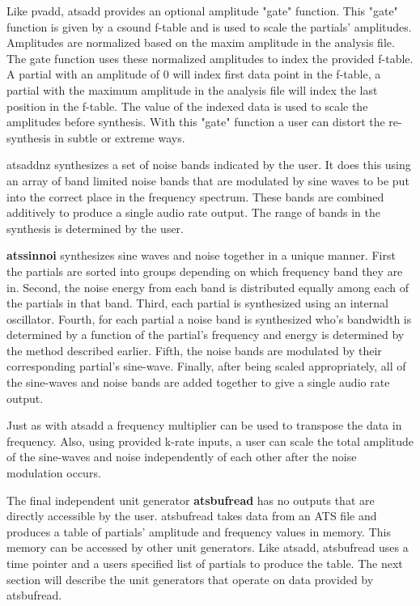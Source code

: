 \documentclass[10pt,letterpaper]{article}
\begin{document}
Like pvadd, atsadd provides an optional amplitude "gate" function.  This "gate" function is given by a csound f-table and is used to scale the partials' amplitudes.  Amplitudes are normalized based on the maxim amplitude in the analysis file.  The gate function uses these normalized amplitudes to index the provided f-table.  A partial with an amplitude of 0 will index first data point in the f-table, a partial with the maximum amplitude in the analysis file will index the last position in the f-table.  The value of the indexed data is used to scale the amplitudes before synthesis.  With this "gate" function a user can distort the re-synthesis in subtle or extreme ways.

atsaddnz synthesizes a set of noise bands indicated by the user.  It does this using an array of band limited noise bands that are modulated by sine waves to be put into the correct place in the frequency spectrum.  These bands are combined additively to produce a single audio rate output.  The range of bands in the synthesis is determined by the user.

\textbf{atssinnoi} synthesizes sine waves and noise together in a unique manner.  First the partials are sorted into groups depending on which frequency band they are in.  Second, the noise energy from each band is distributed equally among each of the partials in that band.  Third, each partial is synthesized using an internal oscillator.  Fourth, for each partial a noise band is synthesized who's bandwidth is determined by a function of the partial's frequency and energy is determined by the method described earlier.  Fifth, the noise bands are modulated by their corresponding partial's sine-wave.  Finally, after being scaled appropriately, all of the sine-waves and noise bands are added together to give a single audio rate output.

Just as with atsadd a frequency multiplier can be used to transpose the data in frequency.  Also, using provided k-rate inputs, a user can scale the total amplitude of the sine-waves and noise independently of each other after the noise modulation occurs.

The final independent unit generator \textbf{atsbufread} has no outputs that are directly accessible by the user.  atsbufread takes data from an ATS file and produces a table of partials' amplitude and frequency values in memory.  This memory can be accessed by other unit generators.  Like atsadd, atsbufread uses a time pointer and a users specified list of partials to produce the table.  The next section will describe the unit generators that operate on data provided by atsbufread.
\end{document}
